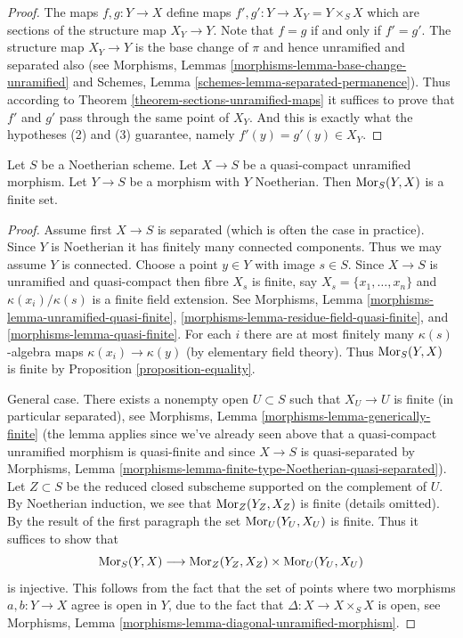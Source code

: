 \begin{proof}
The maps $f, g : Y \to X$ define maps $f', g' : Y \to X_Y = Y \times_S X$
which are sections of the structure map $X_Y \to Y$.
Note that $f = g$ if and only if $f' = g'$.
The structure map $X_Y \to Y$ is the base change of $\pi$ and hence
unramified and separated also (see
Morphisms, Lemmas \ref{morphisms-lemma-base-change-unramified} and
Schemes, Lemma \ref{schemes-lemma-separated-permanence}).
Thus according to Theorem \ref{theorem-sections-unramified-maps}
it suffices to prove that $f'$ and $g'$ pass through the same
point of $X_Y$. And this is exactly what the hypotheses (2) and (3)
guarantee, namely $f'(y) = g'(y) \in X_Y$.
\end{proof}

\begin{lemma}
\label{lemma-finitely-many-maps-to-unramified}
Let $S$ be a Noetherian scheme. Let $X \to S$ be a quasi-compact unramified
morphism. Let $Y \to S$ be a morphism with $Y$ Noetherian. Then
$\mathop{\mathrm{Mor}}\nolimits_S(Y, X)$ is a finite set.
\end{lemma}

\begin{proof}
Assume first $X \to S$ is separated (which is often the case in practice).
Since $Y$ is Noetherian it has finitely many connected components. Thus we
may assume $Y$ is connected. Choose a point $y \in Y$ with image $s \in S$.
Since $X \to S$ is unramified and quasi-compact
then fibre $X_s$ is finite, say $X_s = \{x_1, \ldots, x_n\}$
and $\kappa(x_i)/\kappa(s)$ is a finite field extension.
See Morphisms, Lemma \ref{morphisms-lemma-unramified-quasi-finite},
\ref{morphisms-lemma-residue-field-quasi-finite}, and
\ref{morphisms-lemma-quasi-finite}.
For each $i$ there are at most finitely many $\kappa(s)$-algebra
maps $\kappa(x_i) \to \kappa(y)$ (by elementary field theory).
Thus $\mathop{\mathrm{Mor}}\nolimits_S(Y, X)$ is finite by
Proposition \ref{proposition-equality}.

\medskip\noindent
General case. There exists a nonempty open $U \subset S$ such
that $X_U \to U$ is finite (in particular separated), see
Morphisms, Lemma \ref{morphisms-lemma-generically-finite}
(the lemma applies since we've already seen above that a quasi-compact
unramified morphism is quasi-finite and since $X \to S$ is quasi-separated by
Morphisms, Lemma \ref{morphisms-lemma-finite-type-Noetherian-quasi-separated}).
Let $Z \subset S$ be the reduced closed subscheme supported on
the complement of $U$. By Noetherian induction, we see that
$\mathop{\mathrm{Mor}}\nolimits_Z(Y_Z, X_Z)$ is finite (details omitted).
By the result of the first paragraph the set
$\mathop{\mathrm{Mor}}\nolimits_U(Y_U, X_U)$ is finite. Thus it suffices to show that
$$
\mathop{\mathrm{Mor}}\nolimits_S(Y, X) \longrightarrow \mathop{\mathrm{Mor}}\nolimits_Z(Y_Z, X_Z) \times \mathop{\mathrm{Mor}}\nolimits_U(Y_U, X_U)
$$
is injective. This follows from the fact that the set of points where
two morphisms $a, b : Y \to X$ agree is open in $Y$, due to the fact
that $\Delta : X \to X \times_S X$ is open, see
Morphisms, Lemma \ref{morphisms-lemma-diagonal-unramified-morphism}.
\end{proof}







